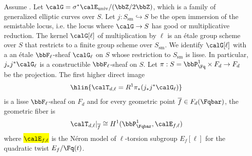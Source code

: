 \begin{proposition}
    Assume . Let $\calG = \sigma^* \calE_{\text{univ}} / (\bbZ/2\bbZ)$, which is a family of generalized elliptic curves over $S$. 
    Let $j: S_{\text{sm}} \hookrightarrow S$ be the open immersion of the semistable locus, i.e. the locus where $\calG \to S$ has good or multiplicative reduction. The kernel $\calG[\ell]$ of multiplication by $\ell$ is an \'etale group scheme over $S$ that restricts to a finite group scheme over $S_{\text{sm}}$. We identify $\calG[\ell]$ with a an \'etale $\bbF_\ell$-sheaf $\calG_\ell$ on $S$ whose restriction to $S_{\text{sm}}$ is lisse. In particular, $j_* j^* \calG_\ell$ is a constructible $\bbF_\ell$-sheaf on $S$. Let $\pi: S = \bbP_{\Fq}^1 \times F_d \to F_d$ be the projection. The first higher direct image
    $$\hlin{\calT_{d,\ell} = R^1 \pi_* (j_* j^* \calG_\ell)}$$
    is a lisse $\bbF_\ell$-sheaf on $F_d$ and for every geometric point $\overline{f} \in F_d(\Fqbar)$, the geometric fiber is 
    $$\calT_{d,\ell}|_{\overline{f}} \cong H^1(\bbP_{\Fqbar}^1, \calE_{f,\ell})$$
    where \hl{$\calE_{f,\ell}$} is the N\'eron model of $\ell$-torsion subgroup $E_f[\ell]$ for the quadratic twist $E_f/\Fq(t)$.
\end{proposition}
